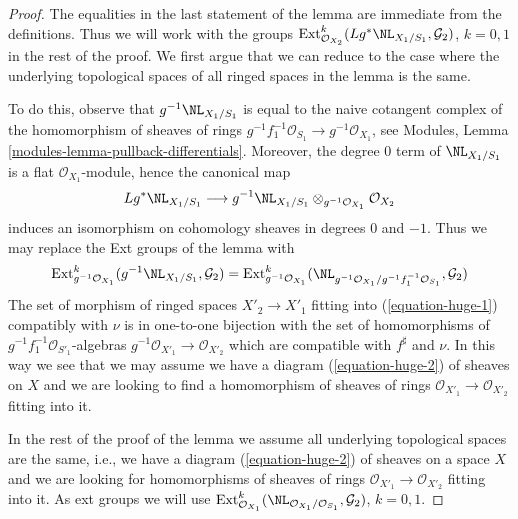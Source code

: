 \begin{proof}
The equalities in the last statement of the lemma are immediate from
the definitions. Thus we will work with the groups
$\text{Ext}^k_{\mathcal{O}_{X_2}}(Lg^*\NL_{X_1/S_1}, \mathcal{G}_2)$,
$k = 0, 1$ in the rest of the proof. We first argue that we can reduce
to the case where the underlying topological spaces of all ringed
spaces in the lemma is the same.

\medskip\noindent
To do this, observe that $g^{-1}\NL_{X_1/S_1}$ is equal to the naive
cotangent complex of the homomorphism of sheaves of rings
$g^{-1}f_1^{-1}\mathcal{O}_{S_1} \to g^{-1}\mathcal{O}_{X_1}$, see
Modules, Lemma \ref{modules-lemma-pullback-differentials}.
Moreover, the degree $0$ term of $\NL_{X_1/S_1}$ is a flat
$\mathcal{O}_{X_1}$-module, hence the canonical map
$$
Lg^*\NL_{X_1/S_1}
\longrightarrow
g^{-1}\NL_{X_1/S_1} \otimes_{g^{-1}\mathcal{O}_{X_1}} \mathcal{O}_{X_2}
$$
induces an isomorphism on cohomology sheaves in degrees $0$ and $-1$.
Thus we may replace the Ext groups of the lemma with
$$
\text{Ext}^k_{g^{-1}\mathcal{O}_{X_1}}(g^{-1}\NL_{X_1/S_1}, \mathcal{G}_2) =
\text{Ext}^k_{g^{-1}\mathcal{O}_{X_1}}(
\NL_{g^{-1}\mathcal{O}_{X_1}/g^{-1}f_1^{-1}\mathcal{O}_{S_1}}, \mathcal{G}_2)
$$
The set of morphism of ringed spaces $X'_2 \to X'_1$ fitting into
(\ref{equation-huge-1}) compatibly with $\nu$
is in one-to-one bijection with
the set of homomorphisms of $g^{-1}f_1^{-1}\mathcal{O}_{S'_1}$-algebras
$g^{-1}\mathcal{O}_{X'_1} \to \mathcal{O}_{X'_2}$ which are compatible with
$f^\sharp$ and $\nu$. In this way we see that we may assume we have a
diagram (\ref{equation-huge-2}) of sheaves on $X$ and we are looking to
find a homomorphism of sheaves of rings
$\mathcal{O}_{X'_1} \to \mathcal{O}_{X'_2}$ fitting into it.

\medskip\noindent
In the rest of the proof of the lemma we assume
all underlying topological spaces are the
same, i.e., we have a diagram (\ref{equation-huge-2}) of sheaves on
a space $X$ and we are looking for homomorphisms of sheaves of rings
$\mathcal{O}_{X'_1} \to \mathcal{O}_{X'_2}$ fitting into it.
As ext groups we will use
$\text{Ext}^k_{\mathcal{O}_{X_1}}(
\NL_{\mathcal{O}_{X_1}/\mathcal{O}_{S_1}}, \mathcal{G}_2)$, $k = 0, 1$.


\end{proof}
